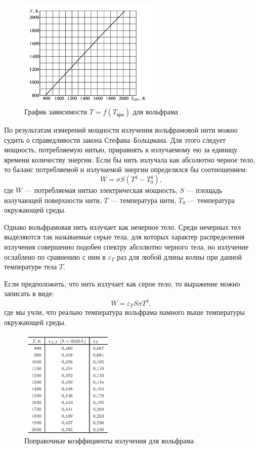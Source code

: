 \documentclass[a4paper,12pt]{article}
\begin{document}
\begin{figure}[h]
\centering
\includegraphics[width=0.6\textwidth]{img1.png}
\caption{График зависимости $T = f(T_{\text{ярк}})$ для вольфрама}
\label{img1}
\end{figure}

По результатам измерений мощности излучения вольфрамовой нити можно судить о справедливости закона Стефана–Больцмана. Для этого следует мощность, потребляемую нитью, приравнять к излучаемому ею за единицу времени количеству энергии. Если бы нить излучала как абсолютно черное тело, то баланс потребляемой и излучаемой энергии определялся бы соотношением:
$$
W = \sigma S (T^4 - T_0^4),
$$
где $W$ — потребляемая нитью электрическая мощность, $S$ — площадь излучающей поверхности нити, $T$ — температура нити, $T_0$ — температура окружающей среды.

Однако вольфрамовая нить излучает как нечерное тело. Среди нечерных тел выделяются так называемые серые тела, для которых характер распределения излучения совершенно подобен спектру абсолютно черного тела, но излучение ослаблено по сравнению с ним в $\varepsilon_T$ раз для любой длины волны при данной температуре тела $T$.

Если предположить, что нить излучает как серое тело, то выражение можно записать в виде:
$$
W = \varepsilon_T S \sigma T^4,
$$
где мы учли, что реально температура вольфрама намного выше температуры окружающей среды.

\begin{figure}[h]
\centering
\includegraphics[width=0.4\textwidth]{img4.png}
\caption{Поправочные коэффициенты излучения для вольфрама}
\label{tab1}
\end{figure}
\end{document}
